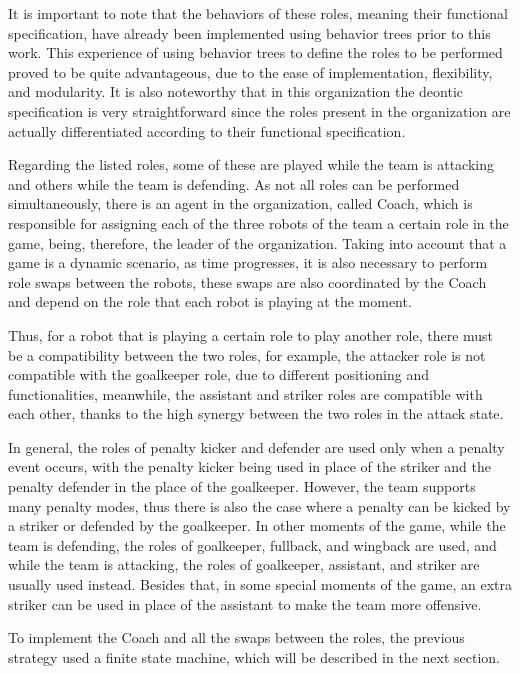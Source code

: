 It is important to note that the behaviors of these roles, meaning their functional specification, have already been implemented using behavior trees prior to this work. This experience of using behavior trees to define the roles to be performed proved to be quite advantageous, due to the ease of implementation, flexibility, and modularity. It is also noteworthy that in this organization the deontic specification is very straightforward since the roles present in the organization are actually differentiated according to their functional specification.

Regarding the listed roles, some of these are played while the team is attacking and others while the team is defending. As not all roles can be performed simultaneously, there is an agent in the organization, called Coach, which is responsible for assigning each of the three robots of the team a certain role in the game, being, therefore, the leader of the organization. Taking into account that a game is a dynamic scenario, as time progresses, it is also necessary to perform role swaps between the robots, these swaps are also coordinated by the Coach and depend on the role that each robot is playing at the moment.

Thus, for a robot that is playing a certain role to play another role, there must be a compatibility between the two roles, for example, the attacker role is not compatible with the goalkeeper role, due to different positioning and functionalities, meanwhile, the assistant and striker roles are compatible with each other, thanks to the high synergy between the two roles in the attack state.

In general, the roles of penalty kicker and defender are used only when a penalty event occurs, with the penalty kicker being used in place of the striker and the penalty defender in the place of the goalkeeper. However, the team supports many penalty modes, thus there is also the case where a penalty can be kicked by a striker or defended by the goalkeeper. In other moments of the game, while the team is defending, the roles of goalkeeper, fullback, and wingback are used, and while the team is attacking, the roles of goalkeeper, assistant, and striker are usually used instead. Besides that, in some special moments of the game, an extra striker can be used in place of the assistant to make the team more offensive.

To implement the Coach and all the swaps between the roles, the previous strategy used a finite state machine, which will be described in the next section.

